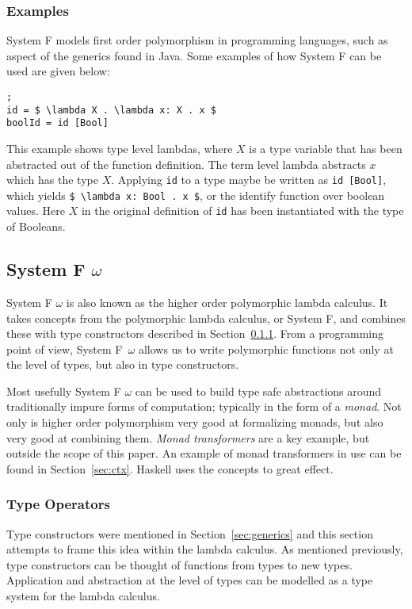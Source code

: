 \subsubsection{Examples}
System F models first order polymorphism in programming languages, such as aspect of
the generics found in Java. Some examples of how System F can be used are given
below:

\begin{lstlisting}[mathescape, nolol, label={lst:systemf}];
id = $ \lambda X . \lambda x: X . x $
boolId = id [Bool]
\end{lstlisting}

This example shows type level lambdas, where $ X $
is a type variable that has been abstracted out of the function definition. The
term level lambda abstracts $ x $ which has the type $ X $. Applying \lstinline{id}
to a type maybe be written as \lstinline[mathescape]{id [Bool]}, which 
yields \lstinline[mathescape]{$ \lambda x: Bool . x $}, or the identify function
over boolean values. Here $ X $ in the original definition of \lstinline{id} has
been instantiated with the type of Booleans.

\subsection{System F $\omega$}\label{sec:omega}
System F $\omega$ is also known as the higher order polymorphic lambda calculus. It
takes concepts from the polymorphic lambda calculus, or System F, and combines
these with type constructors described in Section~\ref{sec:tyops}. From a
programming point of view, System F~$\omega$ allows us to write polymorphic
functions not only at the level of types, but also in type constructors.

Most usefully System F $\omega$ can be used to build type safe abstractions
around traditionally impure forms of computation; typically in the form of
a \textit{monad}. Not only is higher order polymorphism very good at formalizing
monads, but also very good at combining them. \textit{Monad transformers} are
a key example, but outside the scope of this paper. An example of monad transformers
in use can be found in Section~\ref{sec:ctx}. Haskell uses the concepts to
great effect.

\subsubsection{Type Operators}\label{sec:tyops}
Type constructors were mentioned in Section~\ref{sec:generics} and this
section attempts to frame this idea within the lambda calculus. As mentioned
previously, type constructors can be thought of functions from types to new
types. Application and abstraction at the level of types can be modelled as a
type system for the lambda calculus.            

